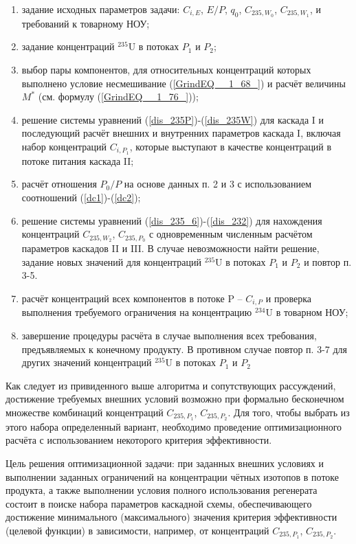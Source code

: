 \begin{enumerate}
    \item задание исходных параметров задачи: $C_{i,E}$, $E/P$, $q_0$, $C_{235,{W_0}}$, $C_{235,{W_1}}$, и требований к товарному НОУ;
    \item задание концентраций $^{235}$U в потоках $P_1$ и $P_2$;
    \item выбор пары компонентов, для относительных концентраций которых выполнено условие несмешивание (\ref{GrindEQ__1_68_}) и расчёт величины $M^{*}$ (см. формулу (\ref{GrindEQ__1_76_}));
    \item решение системы уравнений (\ref{dis_235P})-(\ref{dis_235W}) для каскада I и последующий расчёт внешних и внутренних параметров каскада I, включая набор концентраций $C_{i,{P_1}}$, которые выступают в качестве концентраций в потоке питания каскада II;
    \item расчёт отношения ${P_0}/P$ на основе данных п. 2 и 3 с использованием соотношений (\ref{dc1})-(\ref{dc2});
    \item решение системы уравнений (\ref{dis_235_6})-(\ref{dis_232}) для нахождения концентраций $C_{235,{W_2}}$, $C_{235,{P_0}}$ с одновременным численным расчётом параметров каскадов II и III. В случае невозможности найти решение, задание новых значений для концентраций $^{235}$U в потоках $P_1$ и $P_2$ и повтор п. 3-5. 
    \item расчёт концентраций всех компонентов в потоке P -- $C_{i, P}$ и проверка выполнения требуемого ограничения на концентрацию $^{234}$U в товарном НОУ;
    \item завершение процедуры расчёта в случае выполнения всех требования, предъявляемых к конечному продукту. В противном случае повтор п. 3-7 для других значений концентраций $^{235}$U в потоках $P_1$ и $P_2$
\end{enumerate}

Как следует из привиденного выше алгоритма и сопутствующих рассуждений, достижение требуемых внешних условий возможно при формально бесконечном множестве комбинаций концентраций $C_{235,{P_1}}$, $C_{235,{P_2}}$. Для того, чтобы выбрать из этого набора определенный вариант, необходимо проведение оптимизационного расчёта с использованием некоторого критерия эффективности. 

Цель решения оптимизационной задачи: при заданных внешних условиях и выполнении заданных ограничений на концентрации чётных изотопов в потоке продукта, а также выполнении условия полного использования регенерата состоит в поиске набора параметров каскадной схемы, обеспечивающего достижение минимального (максимального) значения критерия эффективности (целевой функции) в зависимости, например, от концентраций $C_{235,{P_1}}$, $C_{235,{P_2}}$.

